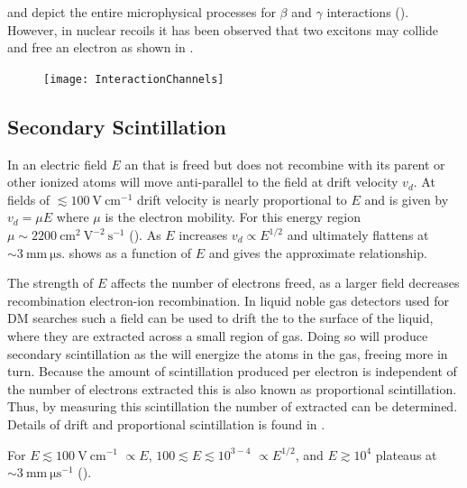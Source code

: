 and 
depict the entire microphysical processes for $\beta$ and $\gamma$ interactions ().  However, in nuclear recoils
it has been observed that two excitons may collide and free an electron as shown in .

\begin{figure}
\centering
\texttt{[image: InteractionChannels]}
\label{fig:interaction_channels}
\end{figure}


\subsection{Secondary Scintillation}
\label{subsec:secondary}
In an electric field $E$ an \electron that is freed but does not recombine with its parent or other ionized atoms will move anti-parallel
to the field at drift velocity $v_{d}$.  At fields of $\lesssim 100\ \mathrm{V\ cm^{-1}}$ drift velocity is nearly proportional to
$E$ and is given by $v_{d} = \mu E$
where $\mu$ is the electron mobility.  For this energy region $\mu \sim 2200\ \mathrm{cm^{2}\ V^{-2}\ s^{-1}}$ ().  As
$E$ increases $v_{d} \propto E^{1/2}$ and ultimately flattens at $\sim 3\ \mathrm{mm\ \mu s}$.   shows \vd
as a function of $E$ and  gives the approximate relationship.

The strength of $E$ affects the number of electrons freed, as a larger field decreases
recombination electron-ion recombination.  In liquid noble gas detectors used for DM searches such a field can be used to drift the
\electron to the surface of the liquid, where they are extracted across a small region of gas.  Doing so will produce secondary
scintillation as the \electron will energize the atoms in the gas, freeing more \electron in turn.  Because the amount of scintillation
produced per electron is independent of the number of electrons extracted this is also known as proportional scintillation.  Thus, by
measuring this scintillation the number of \electron extracted can be determined.  Details of \electron drift and proportional
scintillation is found in .

For $E \lesssim 100\ \mathrm{V\ cm^{-1}}$ \vd$\propto E$, $100 \lesssim E \lesssim 10^{3-4}$
\vd$\propto E^{1/2}$, and $E \gtrsim 10^{4}$ \vd plateaus at $\sim 3\ \mathrm{mm\ \mu s^{-1}}$ ().

